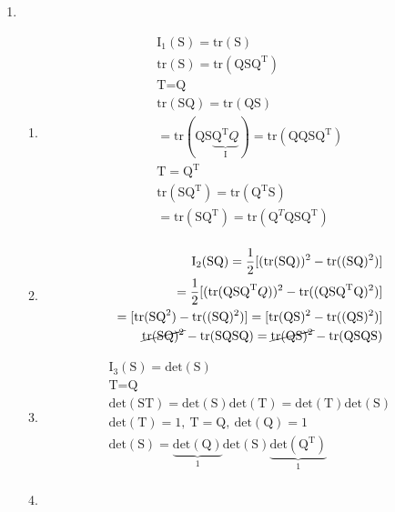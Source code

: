 \begin{problem}
\begin{enumerate}
\begin{enumerate}
                    \boxedeq{}{\Delta(\xi \eta)=\xi\Delta \eta+\eta\Delta \xi+2\nabla \xi \cdot \nabla \eta}
        \end{enumerate}
    \item \begin{enumerate}
        \item \begin{align}
            \text{I}_{1}(\text{S})=\text{tr}(\text{S})\\
            \text{tr}(\text{S})=\text{tr}(\text{QS}\text{Q}^{{\text{T}}}) \\
            \text{T}=\text{Q} \\
            \text{tr}(\text{SQ})=\text{tr}(\text{QS}) \\
            =\text{tr}(\text{QS}\underbrace{ \text{Q}^{\text{T}} Q}_{\text{I}})=\text{tr}(\text{QQS}\text{Q}^{\text{T}}) \\
            \text{T}=\text{Q}^{\text{T}} \\
            \text{tr}(\text{SQ}^{\text{T}})=\text{tr}(\text{Q}^{\text{T}}\text{S})  \\
            =\text{tr}(\text{SQ}^{\text{T}})=\text{tr}(\text{Q}^{T}\text{Q}\text{S}\text{Q}^{\text{T}}) \\
            \end{align}
            \item \begin{align}
                \text{I}_{2}(\text{SQ})=\frac{1}{2}[(\text{tr}(\text{SQ}))^2-\text{tr}((\text{SQ})^2)] \\
                =\frac{1}{2}[(\text{tr}(\text{QSQ}^{\text{T}}Q))^2-\text{tr}((\text{QSQ}^{\text{T}}\text{Q})^2)] \\
                =[\text{tr}(\text{SQ}^2)-\text{tr}((\text{SQ})^2)]=[\text{tr}(\text{QS})^2-\text{tr}((\text{QS})^2)] \\
                \cancel{ \text{tr}(\text{SQ})^2 }-\text{tr}(\text{SQSQ})=\cancel{ \text{tr}(\text{QS})^2 }-\text{tr}(\text{QSQS})
                \end{align}
            \item \begin{align}
                \text{I}_{3}(\text{S})=\text{det}(\text{S}) \\
                \text{T}=\text{Q} \\
                \text{det}(\text{ST})=\text{det}(\text{S})\text{det}(\text{T})=\text{det}(\text{T})\text{det}(\text{S}) \\
                \text{det}(\text{T})=1, \ \text{T}=\text{Q},\ \text{det}(\text{Q})=1 \\
                \text{det}(\text{S})=\underbrace{ \text{det}(\text{Q}) }_{ 1 }\text{det}(\text{S})\underbrace{ \text{det}(\text{Q}^{\text{T}}) }_{ 1 } \\
                \end{align}
                \item 
    

\end{enumerate}
\end{enumerate}
\end{problem}
